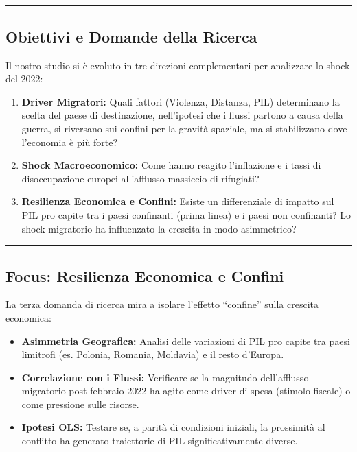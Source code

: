 \documentclass[
  letterpaper,
  DIV=11,
  numbers=noendperiod]{scrartcl}
\author{}
\date{}
\providecommand{\tightlist}{%
  \setlength{\itemsep}{0pt}\setlength{\parskip}{0pt}}
\begin{document}
\subsection{}\label{section}

\titlepage

\begin{center}\rule{0.5\linewidth}{0.5pt}\end{center}

\subsection{Obiettivi e Domande della
Ricerca}\label{obiettivi-e-domande-della-ricerca}

Il nostro studio si è evoluto in tre direzioni complementari per
analizzare lo shock del 2022:

\begin{enumerate}
\def\labelenumi{\arabic{enumi}.}
\item
  \textbf{Driver Migratori:} Quali fattori (Violenza, Distanza, PIL)
  determinano la scelta del paese di destinazione, nell'ipotesi che i
  flussi partono a causa della guerra, si riversano sui confini per la
  gravità spaziale, ma si stabilizzano dove l'economia è più forte?
\item
  \textbf{Shock Macroeconomico:} Come hanno reagito l'inflazione e i
  tassi di disoccupazione europei all'afflusso massiccio di rifugiati?
\item
  \textbf{Resilienza Economica e Confini:} Esiste un differenziale di
  impatto sul PIL pro capite tra i paesi confinanti (prima linea) e i
  paesi non confinanti? Lo shock migratorio ha influenzato la crescita
  in modo asimmetrico?
\end{enumerate}

\begin{center}\rule{0.5\linewidth}{0.5pt}\end{center}

\subsection{Focus: Resilienza Economica e
Confini}\label{focus-resilienza-economica-e-confini}

La terza domanda di ricerca mira a isolare l'effetto ``confine'' sulla
crescita economica:

\begin{itemize}
\tightlist
\item
  \textbf{Asimmetria Geografica:} Analisi delle variazioni di PIL pro
  capite tra paesi limitrofi (es. Polonia, Romania, Moldavia) e il resto
  d'Europa.
\item
  \textbf{Correlazione con i Flussi:} Verificare se la magnitudo
  dell'afflusso migratorio post-febbraio 2022 ha agito come driver di
  spesa (stimolo fiscale) o come pressione sulle risorse.
\item
  \textbf{Ipotesi OLS:} Testare se, a parità di condizioni iniziali, la
  prossimità al conflitto ha generato traiettorie di PIL
  significativamente diverse.
\end{itemize}
\end{document}
